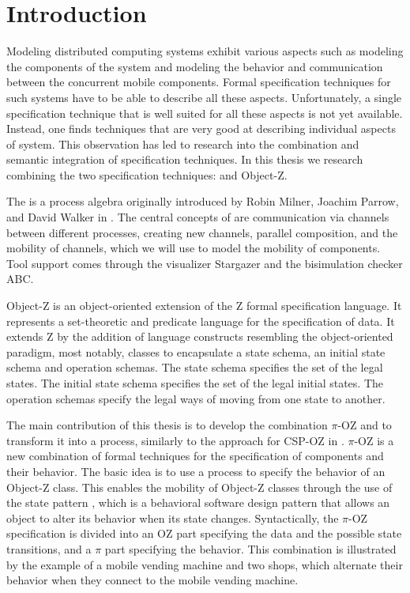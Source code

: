 \chapter{Introduction}
\pagestyle{scrheadings}	
\setcounter{page}{0}
\label{chp_introduction}
Modeling distributed computing systems exhibit various aspects such as modeling the components of the system and modeling the behavior and communication between the concurrent mobile components. Formal specification techniques for such systems have to be able to describe all these aspects. Unfortunately, a single specification technique that is well suited for all these aspects is not yet available. Instead, one finds techniques that are very good at describing individual aspects of system. This observation has led to research into the combination and semantic integration of specification techniques. In this thesis we research combining the two specification techniques:
\picalc{} and Object-Z.

The \picalc{} is a process algebra originally introduced by Robin Milner, Joachim Parrow, and David Walker in \cite{milner1992calculus}. The central concepts of \picalc{} are communication via channels between different processes, creating new channels, parallel composition, and the mobility of channels, which we will use to model the mobility of components. Tool support comes through the \picalc{} visualizer Stargazer and the bisimulation checker ABC.

Object-Z \cite{smith2000the} is an object-oriented extension of the Z formal specification language. It represents a set-theoretic and predicate language for the specification of data. It extends Z by the addition of language constructs resembling the object-oriented paradigm, most notably, classes to encapsulate a state schema, an initial state schema and operation schemas. The state schema specifies the set of the legal states. The initial state schema specifies the set of the legal initial states. The operation schemas specify the legal ways of moving from one state to another.


The main contribution of this thesis is to develop the combination $\pi$-OZ and to transform it into a \picalc{} process, similarly to the approach for CSP-OZ in \cite{olderog}. $\pi$-OZ is a new combination of formal techniques for the specification of components and their behavior. The basic idea is to use a \picalc{} process to specify the behavior of an Object-Z class. This enables the mobility of Object-Z classes through the use of the state pattern \cite{erichgamma1994}, which is a behavioral software design pattern that allows an object to alter its behavior when its state changes. Syntactically, the $\pi$-OZ specification is divided into an OZ part specifying the data and the possible state transitions, and a $\pi$ part specifying the behavior.  This combination is illustrated by the example of a mobile vending machine and two shops, which alternate their behavior when they connect to the mobile vending machine.

